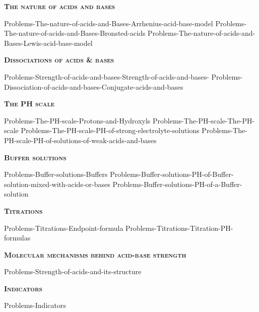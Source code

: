 \documentclass[main.tex]{subfiles}
\newcommand\chapterlabel{Ch-acidbase}
\begin{document}
\newpage
 
\fancyhfoffset[E,O]{0pt}
\setlength{\columnsep}{30pt}
\begin{conclusion}
\end{conclusion}
\begin{multicols*}{2}\setcounter{numA}{1}
{\raggedright\textsc{\textbf{The nature of acids and bases}}\par}
 {Problems-The-nature-of-acids-and-Bases-Arrhenius-acid-base-model}
 {Problems-The-nature-of-acids-and-Bases-Bronsted-acids}
 {Problems-The-nature-of-acids-and-Bases-Lewis-acid-base-model}
{\raggedright\textsc{\textbf{Dissociations of acids \& bases}}\par}
 {Problems-Strength-of-acids-and-bases-Strength-of-acids-and-bases-}
 {Problems-Dissociation-of-acids-and-bases-Conjugate-acids-and-bases}
 
{\raggedright\textsc{\textbf{The PH scale}}\par}
 {Problems-The-PH-scale-Protons-and-Hydroxyls}
 {Problems-The-PH-scale-The-PH-scale}
 {Problems-The-PH-scale-PH-of-strong-electrolyte-solutions}
 {Problems-The-PH-scale-PH-of-solutions-of-weak-acids-and-bases}
			
{\raggedright\textsc{\textbf{Buffer solutions}}\par}
 {Problems-Buffer-solutions-Buffers}
 {Problems-Buffer-solutions-PH-of-Buffer-solution-mixed-with-acids-or-bases}
 {Problems-Buffer-solutions-PH-of-a-Buffer-solution}
{\raggedright\textsc{\textbf{Titrations}}\par}
 {Problems-Titrations-Endpoint-formula}
 {Problems-Titrations-Titration-PH-formulas}
 {\raggedright\textsc{\textbf{Molecular mechanisms behind acid-base strength}}\par}
 {Problems-Strength-of-acids-and-its-structure}
 {\raggedright\textsc{\textbf{Indicators}}\par}
 {Problems-Indicators}
\end{multicols*}
\end{document}
